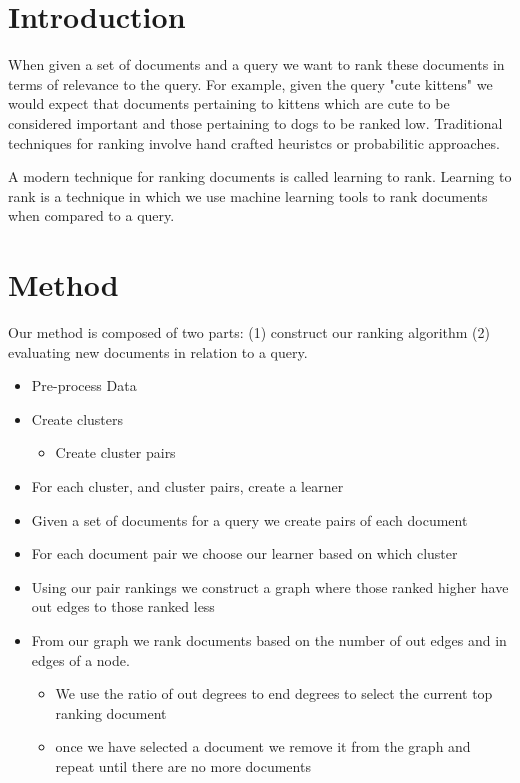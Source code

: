 \documentclass{article}
\begin{document}
    \section{Introduction}
    
    When given a set of documents and a query we want to rank these documents in terms of relevance to the query.
    For example, given the query "cute kittens" we would expect that documents pertaining to kittens which are cute to be considered important and those pertaining to dogs to be ranked low.
    Traditional techniques for ranking involve hand crafted heuristcs or probabilitic approaches.

    A modern technique for ranking documents is called learning to rank.
    Learning to rank is a technique in which we use machine learning tools to rank documents when compared to a query.
    

    \section{Method}

    Our method is composed of two parts: (1) construct our ranking algorithm (2) evaluating new documents in relation to a query.

    \begin{itemize}
        \item Pre-process Data
        \item Create clusters
        \begin{itemize}
            \item Create cluster pairs
        \end{itemize}
        \item For each cluster, and cluster pairs, create a learner 
    \end{itemize}

    \begin{itemize}
        \item Given a set of documents for a query we create pairs of each document
        \item For each document pair we choose our learner based on which cluster 
        \item Using our pair rankings we construct a graph where those ranked higher have out edges to those ranked less
        \item From our graph we rank documents based on the number of out edges and in edges of a node.
        \begin{itemize}
            \item We use the ratio of out degrees to end degrees to select the current top ranking document
            \item once we have selected a document we remove it from the graph and repeat until there are no more documents
        \end{itemize}
    \end{itemize}
\end{document}
